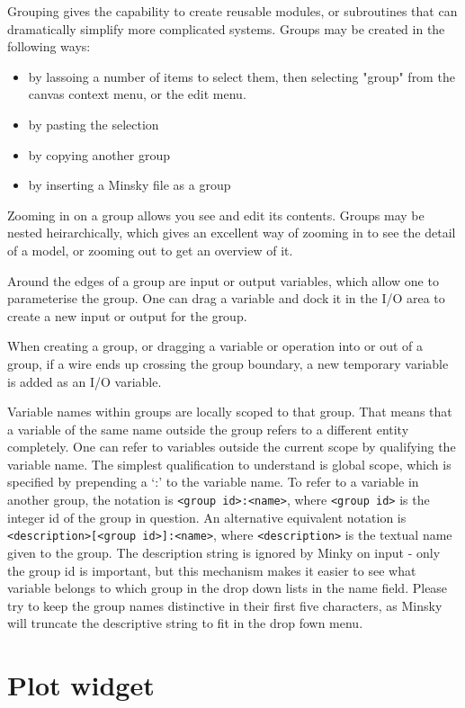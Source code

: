 Grouping gives the capability to create reusable modules, or subroutines that
can dramatically simplify more complicated systems. Groups may be
created in the following ways:
\begin{itemize}
\item by lassoing a number of items to select them, then selecting
"group" from the canvas context menu, or the edit menu.
\item by pasting the selection
\item by copying another group
\item by inserting a Minsky file as a group
\end{itemize}

Zooming in on a group allows you see and edit its contents. Groups may
be nested heirarchically, which gives an excellent way of zooming in
to see the detail of a model, or zooming out to get an overview of it.

Around the edges of a group are input or output variables, which allow
one to parameterise the group. One can drag a variable and dock it in
the I/O area to create a new input or output for the group.

When creating a group, or dragging a variable or operation into or out
of a group, if a wire ends up crossing the group boundary, a new
temporary variable is added as an I/O variable.

Variable names within groups are locally scoped to that group. That
means that a variable of the same name outside the group refers to a
different entity completely. One can refer to variables outside the
current scope by qualifying the variable name. The simplest
qualification to understand is global scope, which is specified by
prepending a `:' to the variable name. To refer to a variable in
another group, the notation is \verb+<group id>:<name>+, where
\verb+<group id>+ is the integer id of the group in question. An
alternative equivalent notation is \verb+<description>[<group id>]:<name>+, where \verb+<description>+ is the textual name given to
the group. The description string is ignored by Minky on input - only
the group id is important, but this mechanism makes it easier to see
what variable belongs to which group in the drop down lists in the
name field. Please try to keep the group names distinctive in their
first five characters, as Minsky will truncate the descriptive string
to fit in the drop fown menu.

\section{Plot widget}
\label{Plot}

